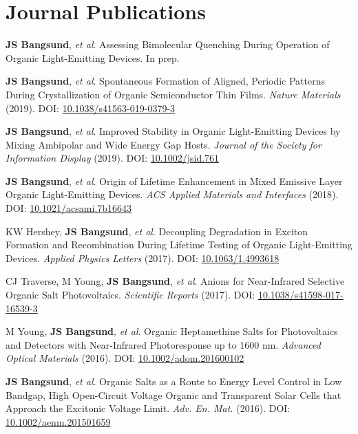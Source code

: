\documentclass{article}
\renewenvironment{itemize}[1]{\begin{compactitem}#1}{\end{compactitem}}
\begin{document}
\section{Journal Publications}
\begin{itemize}
\item[8] \textbf{JS Bangsund}, {\em et al}. Assessing Bimolecular Quenching During Operation of Organic Light-Emitting Devices. In prep.
\item[7] \textbf{JS Bangsund}, {\em et al}. Spontaneous Formation of Aligned, Periodic Patterns During Crystallization of Organic Semiconductor Thin Films. {\em Nature Materials} (2019). DOI:  \href{https://doi.org/10.1038/s41563-019-0379-3}{10.1038/s41563-019-0379-3}
\item[6] \textbf{JS Bangsund}, {\em et al}. Improved Stability in Organic Light-Emitting Devices by Mixing Ambipolar and Wide Energy Gap Hosts. {\em Journal of the Society for Information Display} (2019). DOI:  \href{https://doi.org/10.1002/jsid.761}{10.1002/jsid.761}
\item[5] \textbf{JS Bangsund}, {\em et al}. Origin of Lifetime Enhancement in Mixed Emissive Layer Organic Light-Emitting Devices. {\em ACS Applied Materials and Interfaces} (2018). DOI:  \href{https://doi.org/10.1021/acsami.7b16643}{10.1021/acsami.7b16643}
\item[4]  KW Hershey, \textbf{JS Bangsund}, {\em et al}. Decoupling Degradation in Exciton Formation and Recombination During Lifetime Testing of Organic Light-Emitting Devices. {\em Applied Physics Letters} (2017). DOI:  \href{https://doi.org/10.1063/1.4993618}{10.1063/1.4993618}
\item[3] CJ Traverse, M Young, \textbf{JS Bangsund}, {\em et al}. Anions for Near-Infrared Selective Organic Salt Photovoltaics. {\em Scientific Reports} (2017).  DOI:  \href{https://doi.org/10.1038/s41598-017-16539-3}{10.1038/s41598-017-16539-3}
\item[2] M Young, \textbf{JS Bangsund}, {\em et al}. Organic Heptamethine Salts for Photovoltaics and Detectors with Near-Infrared Photoresponse up to 1600 nm. {\em Advanced Optical Materials} (2016). DOI:  \href{https://doi.org/10.1002/adom.201600102}{10.1002/adom.201600102}
\item[1] \textbf{JS Bangsund}, {\em et al}. Organic Salts as a Route to Energy Level Control in Low Bandgap, High Open-Circuit Voltage Organic and Transparent Solar Cells that Approach the Excitonic Voltage Limit. {\em Adv. En. Mat.} (2016). DOI:  \href{https://doi.org/10.1002/aenm.201501659}{10.1002/aenm.201501659}
\end{itemize}
\end{document}

